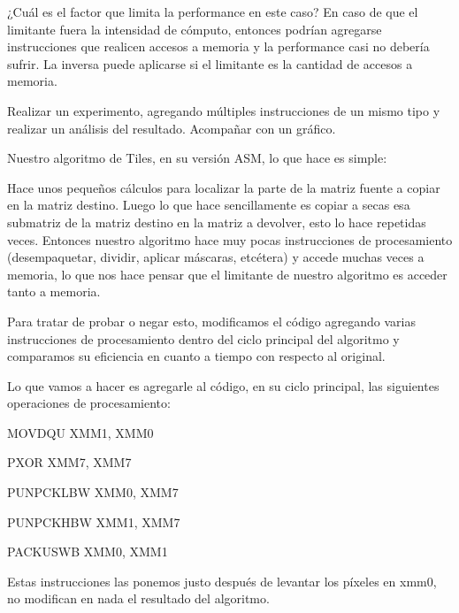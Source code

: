 	¿Cuál es el factor que limita la performance en este caso? En caso de que el limitante
	fuera la intensidad de cómputo, entonces podrían agregarse instrucciones que realicen
	accesos a memoria y la performance casi no debería sufrir. La inversa puede aplicarse
	si el limitante es la cantidad de accesos a memoria.
	
	Realizar un experimento, agregando múltiples instrucciones de un mismo tipo y realizar un análisis
	del resultado. Acompañar con un gráfico.
\vspace*{0.3cm} \noindent

Nuestro algoritmo de Tiles, en su versión ASM, lo que hace es simple:\vspace*{0.3cm} \noindent

Hace unos pequeños cálculos para localizar la parte de la matriz fuente a copiar en la 
matriz destino. Luego lo que hace sencillamente es copiar a secas esa submatriz de la 
matriz destino en la matriz a devolver, esto lo hace repetidas veces. 
Entonces nuestro algoritmo hace muy pocas instrucciones de procesamiento (desempaquetar, 
dividir, aplicar máscaras, etcétera) y accede muchas veces a memoria, lo que nos hace pensar 
que el limitante de nuestro algoritmo es acceder tanto a memoria.\vspace*{0.3cm} \noindent

Para tratar de probar o negar esto, modificamos el código agregando varias instrucciones de 
procesamiento dentro del ciclo principal del algoritmo y comparamos su eficiencia en cuanto a 
tiempo con respecto al original.\vspace*{0.3cm} \noindent

Lo que vamos a hacer es agregarle al código, en su ciclo principal, las siguientes operaciones 
de procesamiento:\vspace*{0.3cm} \noindent


MOVDQU XMM1, XMM0

PXOR XMM7, XMM7 

PUNPCKLBW XMM0, XMM7

PUNPCKHBW XMM1, XMM7

PACKUSWB XMM0, XMM1
\vspace*{0.3cm} \noindent

Estas instrucciones las ponemos justo después de levantar los píxeles en xmm0, no modifican en 
nada el resultado del algoritmo.\vspace*{0.3cm} \noindent

